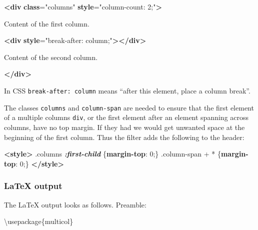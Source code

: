 \documentclass[
]{article}
\newenvironment{Shaded}{}{}
\newcommand{\BuiltInTok}[1]{\textcolor[rgb]{0.00,0.50,0.00}{#1}}
\newcommand{\DecValTok}[1]{\textcolor[rgb]{0.25,0.63,0.44}{#1}}
\newcommand{\ErrorTok}[1]{\textcolor[rgb]{1.00,0.00,0.00}{\textbf{#1}}}
\newcommand{\ExtensionTok}[1]{#1}
\newcommand{\FunctionTok}[1]{\textcolor[rgb]{0.02,0.16,0.49}{#1}}
\newcommand{\InformationTok}[1]{\textcolor[rgb]{0.38,0.63,0.69}{\textbf{\textit{#1}}}}
\newcommand{\KeywordTok}[1]{\textcolor[rgb]{0.00,0.44,0.13}{\textbf{#1}}}
\newcommand{\NormalTok}[1]{#1}
\newcommand{\OperatorTok}[1]{\textcolor[rgb]{0.40,0.40,0.40}{#1}}
\newcommand{\OtherTok}[1]{\textcolor[rgb]{0.00,0.44,0.13}{#1}}
\newcommand{\StringTok}[1]{\textcolor[rgb]{0.25,0.44,0.63}{#1}}
\begin{document}
\begin{Shaded}
\begin{Highlighting}[]
\KeywordTok{\textless{}div} \ErrorTok{class}\OtherTok{=}\StringTok{"columns"} \ErrorTok{style}\OtherTok{=}\StringTok{"column{-}count: 2;"}\KeywordTok{\textgreater{}}

\NormalTok{Content of the first column.}

\KeywordTok{\textless{}div} \ErrorTok{style}\OtherTok{=}\StringTok{"break{-}after: column;"}\KeywordTok{\textgreater{}\textless{}/div\textgreater{}}

\NormalTok{Content of the second column.}

\KeywordTok{\textless{}/div\textgreater{}}
\end{Highlighting}
\end{Shaded}

In CSS \texttt{break-after:\ column} means ``after this element, place a
column break''.

The classes \texttt{columns} and \texttt{column-span} are needed to
ensure that the first element of a multiple columns \texttt{div}, or the
first element after an element spanning across columns, have no top
margin. If they had we would get unwanted space at the beginning of the
first column. Thus the filter adds the following to the header:

\begin{Shaded}
\begin{Highlighting}[]
  \KeywordTok{\textless{}style\textgreater{}}
    \FunctionTok{.columns} \InformationTok{:first{-}child}\NormalTok{ \{}\KeywordTok{margin{-}top}\NormalTok{: }\DecValTok{0}\OperatorTok{;}\NormalTok{\}}
    \FunctionTok{.column{-}span} \OperatorTok{+} \OperatorTok{*}\NormalTok{ \{}\KeywordTok{margin{-}top}\NormalTok{: }\DecValTok{0}\OperatorTok{;}\NormalTok{\}}
  \KeywordTok{\textless{}/style\textgreater{}}
\end{Highlighting}
\end{Shaded}

\hypertarget{latex-output}{%
\subsubsection{LaTeX output}\label{latex-output}}

The LaTeX output looks as follows. Preamble:

\begin{Shaded}
\begin{Highlighting}[]
\BuiltInTok{\textbackslash{}usepackage}\NormalTok{\{}\ExtensionTok{multicol}\NormalTok{\}}
\end{Highlighting}
\end{Shaded}
\end{document}
